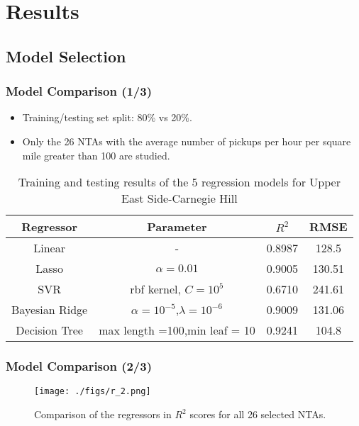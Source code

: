 \documentclass{beamer}
\begin{document}
\section[Results]{Results}

\subsection[Model Selection]{Model Selection}
\begin{frame}
  \frametitle{Model Comparison (1/3)}
  \begin{itemize}
    \item Training/testing set split: 80\% vs 20\%.
    \item Only the 26 NTAs with the average number of pickups per hour per
    square mile greater than 100 are studied.
  \end{itemize}
  \begin{table}[H]
    \renewcommand{\arraystretch}{1.3}
    \caption{Training and testing results of the 5 regression models for Upper
    East Side-Carnegie Hill}
    \label{table:feature}
    \centering
    \begin{tabular}{ | c | c | c | c |}
      \hline      
      Regressor & Parameter & $R^2$ & RMSE \\
      \hline
      Linear  & - &  0.8987 & 128.5 \\
      \hline
      Lasso & $\alpha = 0.01$ & 0.9005 & 130.51 \\
      \hline  
      SVR & rbf kernel, $C=10^5$ & 0.6710 & 241.61\\
      \hline
      Bayesian Ridge & $\alpha=10^{-5}$,$\lambda=10^{-6}$ &0.9009 & 131.06\\
      \hline
      Decision Tree & max length =100,min leaf = 10 & 0.9241 & 104.8\\
      \hline
    \end{tabular}
  \end{table}
\end{frame}

\begin{frame}
  \frametitle{Model Comparison (2/3)}
  \begin{figure}[!t] 
    \centering
    \texttt{[image: ./figs/r\_2.png]}
    \caption{Comparison of the regressors in $R^2$ scores for all 26
    selected NTAs.
    }
    \label{fig:comparison_r2}
  \end{figure}
\end{frame}
\end{document}
